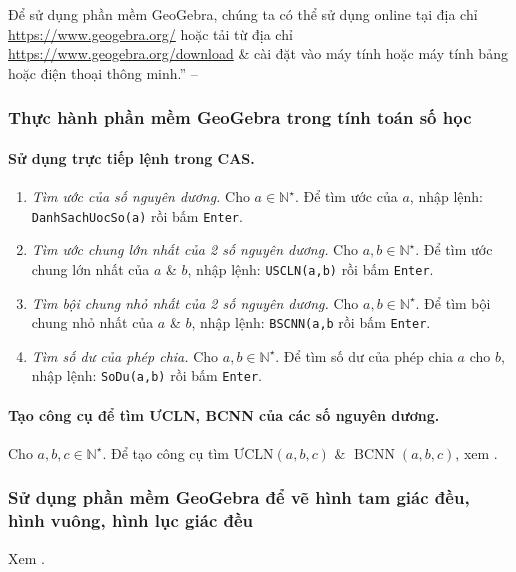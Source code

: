 \documentclass{article}
\numberwithin{equation}{section}
\begin{document}
Để sử dụng phần mềm GeoGebra, chúng ta có thể sử dụng online tại địa chỉ \url{https://www.geogebra.org/} hoặc tải từ địa chỉ \url{https://www.geogebra.org/download} \& cài đặt vào máy tính hoặc máy tính bảng hoặc điện thoại thông minh.'' -- \cite[p. 119]{Thai_Anh_Dat_Ha_Loan_Nam_Quang_Toan_6_tap_1}

\subsubsection{Thực hành phần mềm GeoGebra trong tính toán số học}

\paragraph{Sử dụng trực tiếp lệnh trong CAS.}
\begin{enumerate}
	\item \textit{Tìm ước của số nguyên dương.} Cho $a\in\mathbb{N}^\star$. Để tìm ước của $a$, nhập lệnh: \texttt{DanhSachUocSo(a)} rồi bấm \texttt{Enter}.
	\item \textit{Tìm ước chung lớn nhất của 2 số nguyên dương.} Cho $a,b\in\mathbb{N}^\star$. Để tìm ước chung lớn nhất của $a$ \& $b$, nhập lệnh: \texttt{USCLN(a,b)} rồi bấm \texttt{Enter}.
	\item \textit{Tìm bội chung nhỏ nhất của 2 số nguyên dương.} Cho $a,b\in\mathbb{N}^\star$. Để tìm bội chung nhỏ nhất của $a$ \& $b$, nhập lệnh: \texttt{BSCNN(a,b} rồi bấm \texttt{Enter}.
	\item \textit{Tìm số dư của phép chia.} Cho $a,b\in\mathbb{N}^\star$. Để tìm số dư của phép chia $a$ cho $b$, nhập lệnh: \texttt{SoDu(a,b)} rồi bấm \texttt{Enter}.
\end{enumerate}

\paragraph{Tạo công cụ để tìm ƯCLN, BCNN của các số nguyên dương.} Cho $a,b,c\in\mathbb{N}^\star$. Để tạo công cụ tìm $\mbox{ƯCLN}(a,b,c)$ \& $\operatorname{BCNN}(a,b,c)$, xem \cite[pp. 120--121]{Thai_Anh_Dat_Ha_Loan_Nam_Quang_Toan_6_tap_1}.

\subsubsection{Sử dụng phần mềm GeoGebra để vẽ hình tam giác đều, hình vuông, hình lục giác đều}
Xem \cite[pp. 122--124]{Thai_Anh_Dat_Ha_Loan_Nam_Quang_Toan_6_tap_1}.
\end{document}
